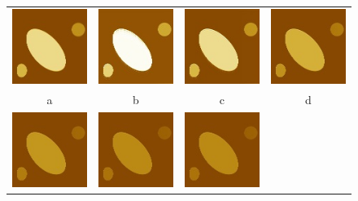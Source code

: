 \documentclass{procDDs}
\begin{document}
\begin{figure}[h!]\center%
	\begin{tabular}{cccc}
		\includegraphics[width=0.2\linewidth]{img/5/1.jpg}&
		\includegraphics[width=0.2\linewidth]{img/5/3.jpg}&
		\includegraphics[width=0.2\linewidth]{img/5/4.jpg}&
		\includegraphics[width=0.2\linewidth]{img/5/6.jpg}\\
		a & b & c & d \\
		\includegraphics[width=0.2\linewidth]{img/5/7.jpg}&
		\includegraphics[width=0.2\linewidth]{img/5/8.jpg}&
		\includegraphics[width=0.2\linewidth]{img/5/8.jpg}&

\end{tabular}
\end{figure}
\end{document}
